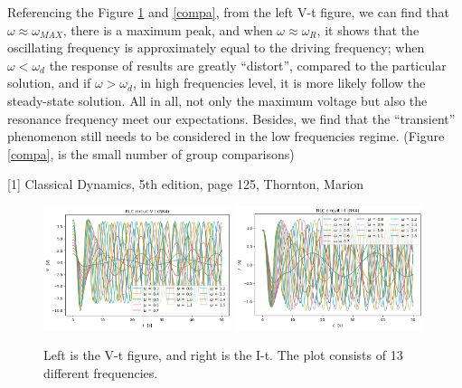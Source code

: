 \documentclass[12pt]{article}
\begin{document}
    Referencing the Figure \ref{Compa} and \ref{compa}, from the left V-t figure, we can find that $\omega \approx \omega_{MAX}$, there is a maximum peak, and when $\omega \approx \omega_{R}$, it shows that the oscillating frequency is approximately equal to the driving frequency; when $\omega < \omega_{d}$ the response of results are greatly ``distort'', compared to the particular solution, and if $\omega > \omega_{d}$, in high frequencies level, it is more likely follow the steady-state solution. All in all, not only the maximum voltage but also the resonance frequency meet our expectations. Besides, we find that the ``transient'' phenomenon still needs to be considered in the low frequencies regime. (Figure \ref{compa}, is the small number of group comparisons)

    \vspace{4cm}

    \footnotesize{[1] Classical Dynamics, 5th edition, page 125, Thornton, Marion}

      \begin{figure}[H]
        \centering 
        \includegraphics[width = 0.49\textwidth]{4V_tot.png}
        \includegraphics[width = 0.49\textwidth]{4I_tot.png}
        \caption{Left is the V-t figure, and right is the I-t. The plot consists of 13 different frequencies.}
        \label{Compa}
      \end{figure}
\end{document}
